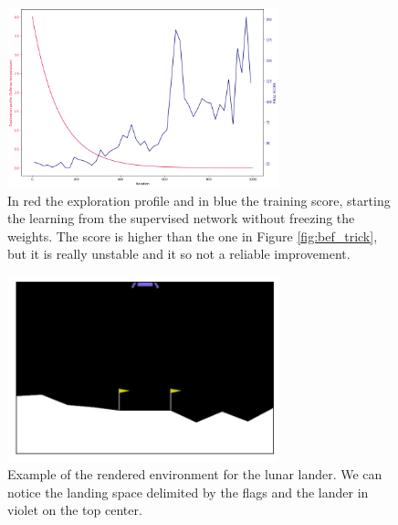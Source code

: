 \begin{figure}[h]
    \centering
    \includegraphics[width=0.7\textwidth]{Images/nofreeze.png}
    \caption{In red the exploration profile and in blue the training score, starting the learning from the supervised network 
    without freezing the weights. The score is higher than the one in Figure \ref{fig:bef_trick}, but it is really unstable and it so not a reliable
    improvement.}
    \label{fig:nofreeze}
\end{figure}

\begin{figure}[h]
    \centering
    \includegraphics[width=0.7\textwidth]{Images/LunarLander.png}
    \caption{Example of the rendered environment for the lunar lander. We can notice the landing space delimited by the flags and the lander 
    in violet on the top center.}
    \label{fig:Lunar}
\end{figure}

